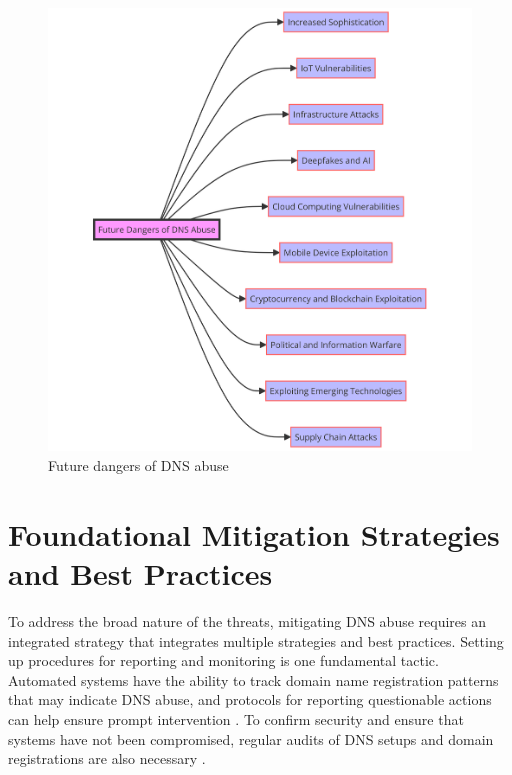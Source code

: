 \captionsetup{font= footnotesize}
\begin{figure}[H]
\centering
\includegraphics[width=1.2\textwidth]{background/DNSfutureDanger.png}
\caption{Future dangers of DNS abuse}
\label{fig:figureFive}
\end{figure}
\newpage


\section{Foundational Mitigation Strategies and Best Practices }

To address the broad nature of the threats, mitigating DNS abuse requires an integrated strategy that integrates multiple strategies and best practices. Setting up procedures for reporting and monitoring is one fundamental tactic. Automated systems have the ability to track domain name registration patterns that may indicate DNS abuse, and protocols for reporting questionable actions can help ensure prompt intervention \cite{icannndnssec}. To confirm security and ensure that systems have not been compromised, regular audits of DNS setups and domain registrations are also necessary \cite{lucas2021tls} .

